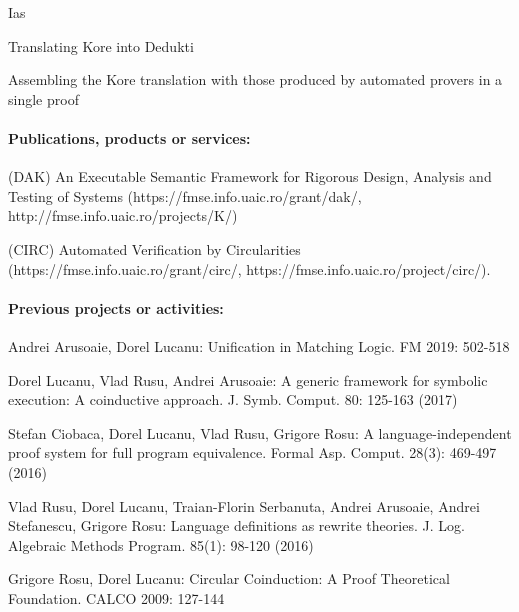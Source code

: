 \begin{sitedescription}{Ias}


\begin{compactitem}
\item Translating Kore into Dedukti
\item Assembling the Kore translation with those produced by automated provers in a single proof
\end{compactitem}

\paragraph*{Publications, products or services:}


\begin{compactitem}
\item  (DAK) An Executable Semantic Framework for Rigorous Design, Analysis and Testing of Systems
 (https://fmse.info.uaic.ro/grant/dak/, http://fmse.info.uaic.ro/projects/K/) 
\item (CIRC) Automated Verification by Circularities  (https://fmse.info.uaic.ro/grant/circ/, https://fmse.info.uaic.ro/project/circ/).
\end{compactitem}

\paragraph*{Previous projects or activities:}


\begin{compactitem}
\item Andrei Arusoaie, Dorel Lucanu:
Unification in Matching Logic. FM 2019: 502-518
\item Dorel Lucanu, Vlad Rusu, Andrei Arusoaie:
A generic framework for symbolic execution: A coinductive approach. J. Symb. Comput. 80: 125-163 (2017)
\item Stefan Ciobaca, Dorel Lucanu, Vlad Rusu, Grigore Rosu:
A language-independent proof system for full program equivalence. Formal Asp. Comput. 28(3): 469-497 (2016)
\item Vlad Rusu, Dorel Lucanu, Traian-Florin Serbanuta, Andrei Arusoaie, Andrei Stefanescu, Grigore Rosu:
Language definitions as rewrite theories. J. Log. Algebraic Methods Program. 85(1): 98-120 (2016)
\item Grigore Rosu, Dorel Lucanu: Circular Coinduction: A Proof Theoretical Foundation. CALCO 2009: 127-144
\end{compactitem}


\end{sitedescription}
